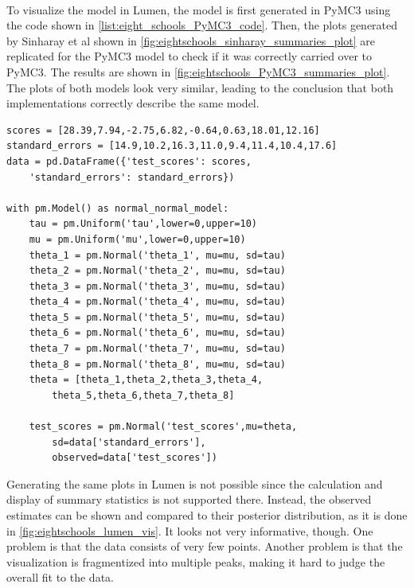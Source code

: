 \documentclass{article}
\begin{document}
\\
To visualize the model in Lumen, the model is first generated in PyMC3 using the code shown in \autoref{list:eight_schools_PyMC3_code}. Then, the plots generated by Sinharay et al shown in \autoref{fig:eightschools_sinharay_summaries_plot} are replicated for the PyMC3 model to check if it was correctly carried over to PyMC3. The results are shown in \autoref{fig:eightschools_PyMC3_summaries_plot}. The plots of both models look very similar, leading to the conclusion that both implementations correctly describe the same model.\\
\begin{minipage}{\linewidth}
\begin{lstlisting}[caption={PyMC3 model of the eight schools example}, label={list:eight_schools_PyMC3_code},captionpos=b]
scores = [28.39,7.94,-2.75,6.82,-0.64,0.63,18.01,12.16]
standard_errors = [14.9,10.2,16.3,11.0,9.4,11.4,10.4,17.6]
data = pd.DataFrame({'test_scores': scores, 
    'standard_errors': standard_errors})

with pm.Model() as normal_normal_model:
    tau = pm.Uniform('tau',lower=0,upper=10)
    mu = pm.Uniform('mu',lower=0,upper=10)
    theta_1 = pm.Normal('theta_1', mu=mu, sd=tau)
    theta_2 = pm.Normal('theta_2', mu=mu, sd=tau)
    theta_3 = pm.Normal('theta_3', mu=mu, sd=tau)
    theta_4 = pm.Normal('theta_4', mu=mu, sd=tau)
    theta_5 = pm.Normal('theta_5', mu=mu, sd=tau)
    theta_6 = pm.Normal('theta_6', mu=mu, sd=tau)
    theta_7 = pm.Normal('theta_7', mu=mu, sd=tau)
    theta_8 = pm.Normal('theta_8', mu=mu, sd=tau)
    theta = [theta_1,theta_2,theta_3,theta_4,
        theta_5,theta_6,theta_7,theta_8]

    test_scores = pm.Normal('test_scores',mu=theta,
        sd=data['standard_errors'], 
        observed=data['test_scores'])
\end{lstlisting}
\end{minipage}
Generating the same plots in Lumen is not possible since the calculation and display of summary statistics is not supported there. Instead, the observed estimates can be shown and compared to their posterior distribution, as it is done in \autoref{fig:eightschools_lumen_vis}. It looks not very informative, though. One problem is that the data consists of very few points. Another problem is that the visualization is fragmentized into multiple peaks, making it hard to judge the overall fit to the data.
\end{document}
